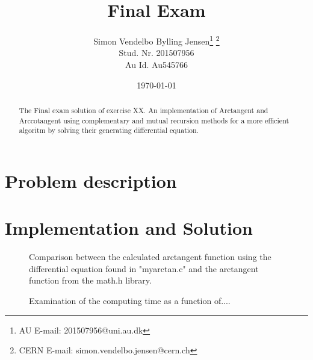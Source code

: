 \documentclass[twocolumn]{article}
\begin{document}
\title{Final Exam}
\author{Simon Vendelbo Bylling Jensen\thanks{AU E-mail: 201507956@uni.au.dk} \thanks{CERN E-mail: simon.vendelbo.jensen@cern.ch}\\
Stud. Nr. 201507956 \\
Au Id. Au545766}
\date{\today}
\maketitle

\begin{abstract}
The Final exam solution of exercise XX. An implementation of Arctangent and Arccotangent using complementary and mutual recursion methods for a more efficient algoritm by solving their generating differential equation. 
\end{abstract}

\section*{Problem description}




\section*{Implementation and Solution}
  \begin{figure}[h]

\caption{Comparison between the calculated arctangent function using the differential equation found in "myarctan.c" and the arctangent function from the math.h library.}
\label{fig-atan}
\end{figure}

\begin{figure}[h]

\caption{Examination of the computing time as a function of....}
\label{fig-atan}
\end{figure}
\end{document}
